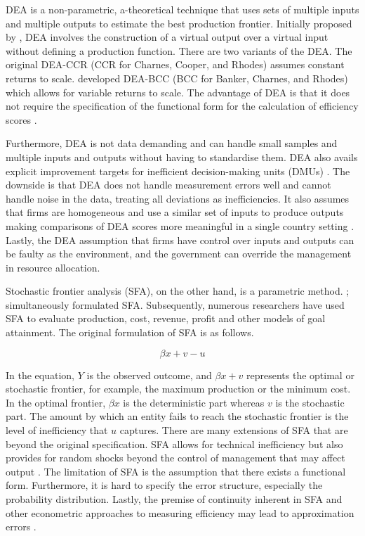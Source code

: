 \documentclass[a4paper,nobind]{templates/ociamthesis}
\begin{document}
DEA is a non-parametric, a-theoretical technique that uses sets of multiple inputs and multiple outputs to estimate the best production frontier. Initially proposed by \textcite{charnes1978measuring}, DEA involves the construction of a virtual output over a virtual input without defining a production function. There are two variants of the DEA. The original DEA-CCR (CCR for Charnes, Cooper, and Rhodes) assumes constant returns to scale. \textcite{banker1984some} developed DEA-BCC (BCC for Banker, Charnes, and Rhodes) which allows for variable returns to scale. The advantage of DEA is that it does not require the specification of the functional form for the calculation of efficiency scores \autocite{cook2014data}.

Furthermore, DEA is not data demanding and can handle small samples and multiple inputs and outputs without having to standardise them. DEA also avails explicit improvement targets for inefficient decision-making units (DMUs) \autocite{paradi2017data}. The downside is that DEA does not handle measurement errors well and cannot handle noise in the data, treating all deviations as inefficiencies. It also assumes that firms are homogeneous and use a similar set of inputs to produce outputs making comparisons of DEA scores more meaningful in a single country setting \autocite{lebovics2016financial}. Lastly, the DEA assumption that firms have control over inputs and outputs can be faulty as the environment, and the government can override the management in resource allocation.

Stochastic frontier analysis (SFA), on the other hand, is a parametric method. \textcite{aigner1977formulation}; \textcite{meeusen1977technical} simultaneously formulated SFA. Subsequently, numerous researchers have used SFA to evaluate production, cost, revenue, profit and other models of goal attainment. The original formulation of SFA is as follows.

\begin{equation}
\beta{x} + v - u
\end{equation}

In the equation, \(Y\) is the observed outcome, and \(\beta{x} + v\) represents the optimal or stochastic frontier, for example, the maximum production or the minimum cost. In the optimal frontier, \(\beta{x}\) is the deterministic part whereas \(v\) is the stochastic part. The amount by which an entity fails to reach the stochastic frontier is the level of inefficiency that \(u\) captures. There are many extensions of SFA that are beyond the original specification. SFA allows for technical inefficiency but also provides for random shocks beyond the control of management that may affect output \textcite{kumbhakar2015practitioner}. The limitation of SFA is the assumption that there exists a functional form. Furthermore, it is hard to specify the error structure, especially the probability distribution. Lastly, the premise of continuity inherent in SFA and other econometric approaches to measuring efficiency may lead to approximation errors \autocite{cullinane2006technical}.
\end{document}
